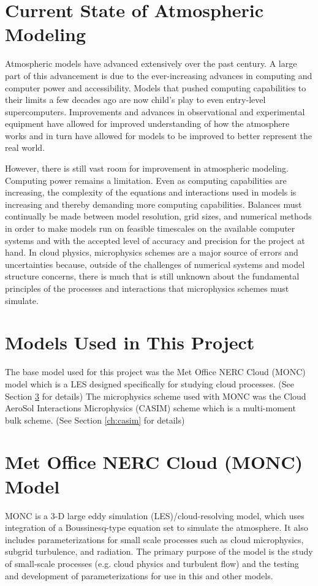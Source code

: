 \section{Current State of Atmospheric Modeling} \label{sec:currentState}
Atmospheric models have advanced extensively over the past century. A large part of this advancement is due to the ever-increasing advances in computing and computer power and accessibility. Models that pushed computing capabilities to their limits a few decades ago are now child's play to even entry-level supercomputers. Improvements and advances in observational and experimental equipment have allowed for improved understanding of how the atmosphere works and in turn have allowed for models to be improved to better represent the real world. 

However, there is still vast room for improvement in atmospheric modeling. Computing power remains a limitation. Even as computing capabilities are increasing, the complexity of the equations and interactions used in models is increasing and thereby demanding more computing capabilities. Balances must continually be made between model resolution, grid sizes, and numerical methods in order to make models run on feasible timescales on the available computer systems and with the accepted level of accuracy and precision for the project at hand. In cloud physics, microphysics schemes are a major source of errors and uncertainties because, outside of the challenges of numerical systems and model structure concerns, there is much that is still unknown about the fundamental principles of the processes and interactions that microphysics schemes must simulate. \citep{morr2020}

\section{Models Used in This Project} \label{sec:projectModels}
The base model used for this project was the Met Office NERC Cloud (MONC) model which is a LES designed specifically for studying cloud processes. (See Section \ref{ch:monc} for details) The microphysics scheme used with MONC was the Cloud AeroSol Interactions Microphysics (CASIM) scheme which is a multi-moment bulk scheme. (See Section \ref{ch:casim} for details)

\section{Met Office NERC Cloud (MONC) Model} \label{ch:monc}
MONC is a 3-D large eddy simulation (LES)/cloud-resolving model, which uses integration of a Boussinesq-type equation set to simulate the atmosphere. It also includes parameterizations for small scale processes such as cloud microphysics, subgrid turbulence, and radiation. The primary purpose of the model is the study of small-scale processes (e.g. cloud physics and turbulent flow) and the testing and development of parameterizations for use in this and other models. \citep{brown2015}

